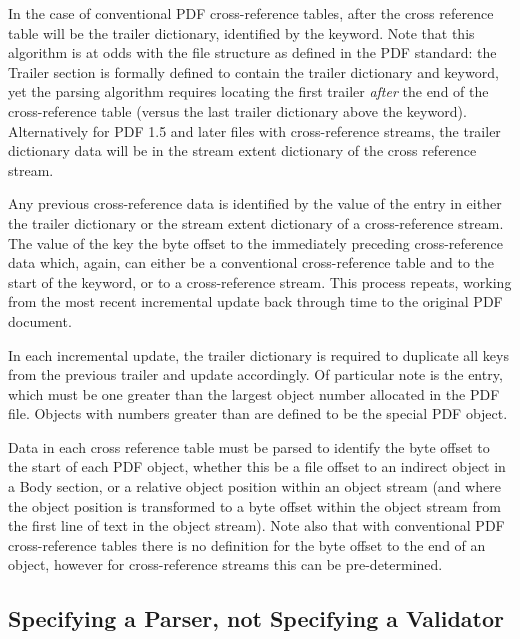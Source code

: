 In the case of conventional PDF
cross-reference tables, after the cross reference table will be the
trailer dictionary, identified by the  keyword. 
Note that this algorithm is at
odds with the file structure as defined in the PDF standard: the Trailer section is formally defined
to contain the trailer dictionary and  keyword, yet the parsing algorithm
requires locating the first trailer \emph{after} the end of the cross-reference table 
(versus the last trailer dictionary above the  keyword). 
Alternatively for PDF 1.5 and later files with cross-reference
streams, the trailer dictionary data will be in the stream extent
dictionary of the cross reference stream. 

Any previous cross-reference data is identified by the value of the  entry in either
the trailer dictionary or the stream extent dictionary of a cross-reference stream. The
value of the  key the byte offset to the immediately
preceding cross-reference data which, again, can either be a conventional
cross-reference table and to the start of the  keyword, or to a
cross-reference stream. This process repeats, working from the most recent incremental
update back through time to the original PDF document.

In each incremental update, the trailer dictionary is required to duplicate all keys from the previous
trailer and update accordingly. Of particular note is the  entry, which must be
one greater than the largest object number allocated in the PDF file. Objects with numbers greater
than  are defined to be the special PDF  object.

Data in each cross reference table must be parsed to
identify the byte offset to the start of each PDF object, whether this be a file offset to an indirect object in a Body section, or a relative object position within an object stream (and where the object position is transformed to a byte offset within the object stream from the first line of text in the object stream). Note also that with conventional PDF cross-reference tables there is no definition for the byte offset to the end of an object, however for cross-reference streams this can be pre-determined.


\subsection{Specifying a Parser, not Specifying a Validator}
\label{sec:spec-approach}

